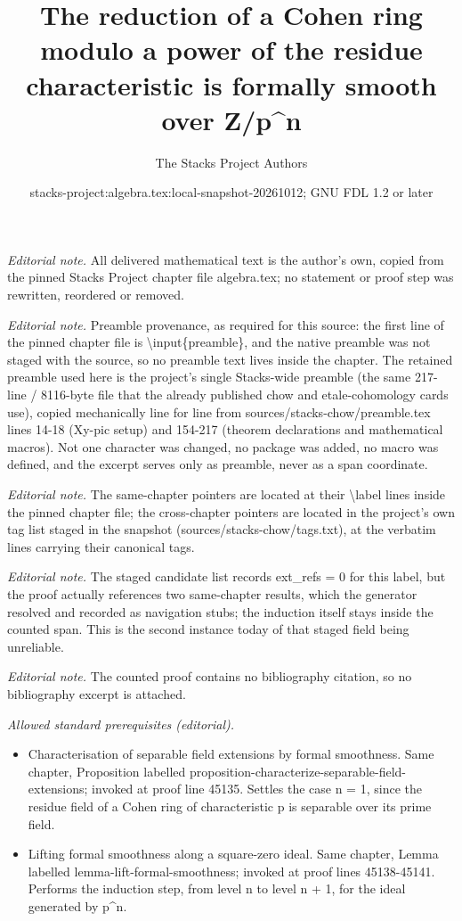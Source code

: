 \documentclass[10pt,a4paper]{amsart}
\title{The reduction of a Cohen ring modulo a power of the residue characteristic is formally smooth over Z/p\textasciicircum{}n}
\author{The Stacks Project Authors}
\date{stacks-project:algebra.tex:local-snapshot-20261012; GNU FDL 1.2 or later}
\theoremstyle{plain}
\theoremstyle{definition}
\theoremstyle{remark}
\numberwithin{equation}{subsection}
\begin{document}
\maketitle
\noindent\textit{Editorial note.} All delivered mathematical text is the author's own, copied from the pinned Stacks Project chapter file algebra.tex; no statement or proof step was rewritten, reordered or removed.\par\medskip
\noindent\textit{Editorial note.} Preamble provenance, as required for this source: the first line of the pinned chapter file is \textbackslash{}input\{preamble\}, and the native preamble was not staged with the source, so no preamble text lives inside the chapter. The retained preamble used here is the project's single Stacks-wide preamble (the same 217-line / 8116-byte file that the already published chow and etale-cohomology cards use), copied mechanically line for line from sources/stacks-chow/preamble.tex lines 14-18 (Xy-pic setup) and 154-217 (theorem declarations and mathematical macros). Not one character was changed, no package was added, no macro was defined, and the excerpt serves only as preamble, never as a span coordinate.\par\medskip
\noindent\textit{Editorial note.} The same-chapter pointers are located at their \textbackslash{}label lines inside the pinned chapter file; the cross-chapter pointers are located in the project's own tag list staged in the snapshot (sources/stacks-chow/tags.txt), at the verbatim lines carrying their canonical tags.\par\medskip
\noindent\textit{Editorial note.} The staged candidate list records ext\_refs = 0 for this label, but the proof actually references two same-chapter results, which the generator resolved and recorded as navigation stubs; the induction itself stays inside the counted span. This is the second instance today of that staged field being unreliable.\par\medskip
\noindent\textit{Editorial note.} The counted proof contains no bibliography citation, so no bibliography excerpt is attached.\par\medskip
\noindent\textit{Allowed standard prerequisites (editorial).}\begin{itemize}
\item Characterisation of separable field extensions by formal smoothness. Same chapter, Proposition labelled proposition-characterize-separable-field-extensions; invoked at proof line 45135. Settles the case n = 1, since the residue field of a Cohen ring of characteristic p is separable over its prime field.
\item Lifting formal smoothness along a square-zero ideal. Same chapter, Lemma labelled lemma-lift-formal-smoothness; invoked at proof lines 45138-45141. Performs the induction step, from level n to level n + 1, for the ideal generated by p\textasciicircum{}n.
\end{itemize}\medskip
\end{document}
